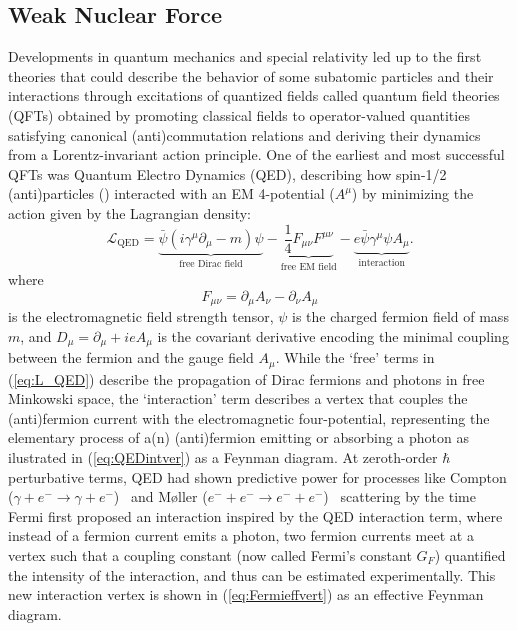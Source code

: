\subsection{Weak Nuclear Force}
Developments in quantum mechanics and special relativity led up to the first theories that could describe the behavior of some subatomic particles and their interactions through excitations of quantized fields called quantum field theories (QFTs) obtained by promoting classical fields to operator-valued quantities satisfying canonical (anti)commutation relations and deriving their dynamics from a Lorentz-invariant action principle. One of the earliest and most successful QFTs was Quantum Electro Dynamics (QED), describing how spin-1/2 (anti)particles (\stackon[.1pt]{$\psi$}{\brabar}) interacted with an EM 4-potential ($A^\mu$) by minimizing the action given by the Lagrangian density: 
\begin{equation}
  \mathcal{L}_{\text{QED}} = \underbrace{\bar{\psi}(i\gamma^\mu\partial_\mu - m)\psi}_{\text{free Dirac field}} - \underbrace{\frac{1}{4}F_{\mu\nu}F^{\mu\nu}}_{\text{free EM field}} - \underbrace{e\bar{\psi}\gamma^\mu\psi A_\mu}_{\text{interaction}}.
  \label{eq:L_QED}
\end{equation}
\noindent where
\begin{equation}\label{eq:Amunu}
F_{\mu\nu} = \partial_\mu A_\nu - \partial_\nu A_\mu
\end{equation}
is the electromagnetic field strength tensor, $\psi$ is the charged fermion field of mass $m$, and $D_\mu = \partial_\mu + ieA_\mu$ is the covariant derivative encoding the minimal coupling between the fermion and the gauge field $A_\mu$. While the `free' terms in (\ref{eq:L_QED}) describe the propagation of Dirac fermions and photons in free Minkowski space, the `interaction' term describes a vertex that couples the (anti)fermion current with the electromagnetic four-potential, representing the elementary process of a(n) (anti)fermion emitting or absorbing a photon as ilustrated in (\ref{eq:QEDintver}) as a Feynman diagram. At zeroth-order $\hbar$ perturbative terms, QED had shown predictive power for processes like Compton ($\gamma + e^- \rightarrow \gamma + e^-$)~\cite{KleinNishina1929} and M\o ller ($e^- + e^- \rightarrow e^- + e^-$)~\cite{Moller1932} scattering by the time Fermi first proposed an interaction inspired by the QED interaction term, where instead of a fermion current emits a photon, two fermion currents meet at a vertex such that a coupling constant (now called Fermi's constant $G_F$) quantified the intensity of the interaction, and thus can be estimated experimentally. This new interaction vertex is shown in (\ref{eq:Fermieffvert}) as an effective Feynman diagram.
